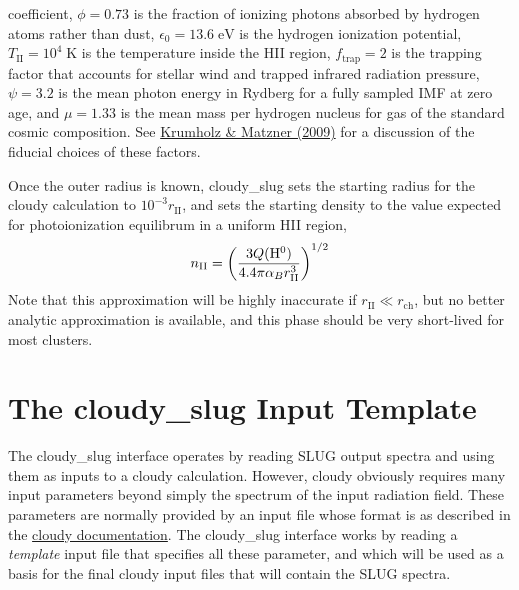 \documentclass[letterpaper,10pt,english]{sphinxmanual}
\begin{document}
coefficient, \(\phi = 0.73\) is the fraction of ionizing photons absorbed
by hydrogen atoms rather than dust, \(\epsilon_0 =
13.6\;\mathrm{eV}\) is the hydrogen ionization potential,
\(T_{\mathrm{II}} = 10^4\;\mathrm{K}\) is the temperature inside
the HII region, \(f_{\mathrm{trap}} = 2\) is the trapping factor
that accounts for stellar wind and trapped infrared radiation
pressure, \(\psi = 3.2\) is the mean photon energy in Rydberg for
a fully sampled IMF at zero age, and \(\mu = 1.33\) is the mean
mass per hydrogen nucleus for gas of the standard cosmic
composition. See \href{http://adsabs.harvard.edu/abs/2009ApJ...703.1352K}{Krumholz \& Matzner (2009)} for a discussion
of the fiducial choices of these factors.

Once the outer radius is known, cloudy\_slug sets the starting radius
for the cloudy calculation to \(10^{-3} r_{\mathrm{II}}\), and
sets the starting density to the value expected for photoionization
equilibrum in a uniform HII region,
\begin{gather}
\begin{split}n_{\mathrm{II}} = \left(\frac{3
Q(\mathrm{H}^0)}{4.4 \pi\alpha_B
r_{\mathrm{II}}^3}\right)^{1/2}\end{split}\notag
\end{gather}
Note that this approximation will be highly inaccurate if
\(r_{\mathrm{II}} \ll r_{\mathrm{ch}}\), but no better analytic
approximation is available, and this phase should be very short-lived
for most clusters.


\section{The cloudy\_slug Input Template}
\label{cloudy:the-cloudy-slug-input-template}\label{cloudy:ssec-cloudy-template}
The cloudy\_slug interface operates by reading SLUG output spectra and
using them as inputs to a cloudy calculation. However, cloudy
obviously requires many input parameters beyond simply the spectrum of
the input radiation field. These parameters are normally provided by
an input file whose format is as described in the \href{http://nublado.org}{cloudy documentation}. The cloudy\_slug interface works by reading a
\emph{template} input file that specifies all these parameter, and which
will be used as a basis for the final cloudy input files that will
contain the SLUG spectra.
\end{document}
